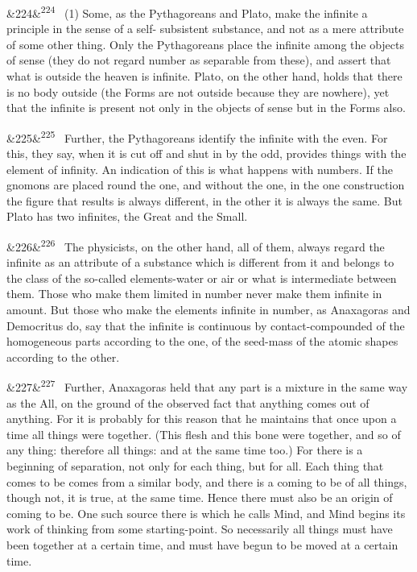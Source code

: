 \documentclass[12pt]{article}
\newcommand{\para}[1][]{\par\noindent\ifx&#1&\else\textsuperscript{\footnotesize #1}~\fi}
\begin{document}
\para[224] (1) Some, as the Pythagoreans and Plato, make the infinite a principle in the sense of a self- subsistent substance, and not as a mere attribute of some other thing. Only the Pythagoreans place the infinite among the objects of sense (they do not regard number as separable from these), and assert that what is outside the heaven is infinite. Plato, on the other hand, holds that there is no body outside (the Forms are not outside because they are nowhere), yet that the infinite is present not only in the objects of sense but in the Forms also.

\para[225] Further, the Pythagoreans identify the infinite with the even. For this, they say, when it is cut off and shut in by the odd, provides things with the element of infinity. An indication of this is what happens with numbers. If the gnomons are placed round the one, and without the one, in the one construction the figure that results is always different, in the other it is always the same. But Plato has two infinites, the Great and the Small.

\para[226] The physicists, on the other hand, all of them, always regard the infinite as an attribute of a substance which is different from it and belongs to the class of the so-called elements-water or air or what is intermediate between them. Those who make them limited in number never make them infinite in amount. But those who make the elements infinite in number, as Anaxagoras and Democritus do, say that the infinite is continuous by contact-compounded of the homogeneous parts according to the one, of the seed-mass of the atomic shapes according to the other.

\para[227] Further, Anaxagoras held that any part is a mixture in the same way as the All, on the ground of the observed fact that anything comes out of anything. For it is probably for this reason that he maintains that once upon a time all things were together. (This flesh and this bone were together, and so of any thing: therefore all things: and at the same time too.) For there is a beginning of separation, not only for each thing, but for all. Each thing that comes to be comes from a similar body, and there is a coming to be of all things, though not, it is true, at the same time. Hence there must also be an origin of coming to be. One such source there is which he calls Mind, and Mind begins its work of thinking from some starting-point. So necessarily all things must have been together at a certain time, and must have begun to be moved at a certain time.
\end{document}

